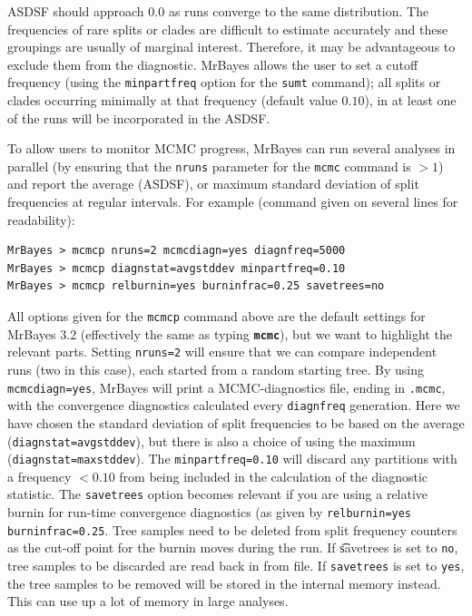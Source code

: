 \documentclass[12pt]{book}
\newcommand{\ttt}[1]{\texttt{#1}}
\newcommand{\tb}[1]{\ttt{\textbf{#1}}}
\begin{document}
ASDSF should approach $0.0$ as runs converge to the same distribution. The frequencies of rare
splits or clades are difficult to estimate accurately and these groupings are usually of marginal
interest. Therefore, it may be advantageous to exclude them from the diagnostic. MrBayes allows the
user to set a cutoff frequency (using the \ttt{minpartfreq} option for the \ttt{sumt} command); all
splits or clades occurring minimally at that frequency (default value $0.10$), in at least one of
the runs will be incorporated in the ASDSF.

To allow users to monitor MCMC progress, MrBayes can run several analyses in parallel (by ensuring
that the \ttt{nruns} parameter for the \ttt{mcmc} command is $>1$) and report the average (ASDSF),
or maximum standard deviation of split frequencies at regular intervals. For example (command given
on several lines for readability):

\small
\begin{singlespacing}
\begin{verbatim}
MrBayes > mcmcp nruns=2 mcmcdiagn=yes diagnfreq=5000
MrBayes > mcmcp diagnstat=avgstddev minpartfreq=0.10
MrBayes > mcmcp relburnin=yes burninfrac=0.25 savetrees=no
\end{verbatim}
\end{singlespacing}
\normalsize

All options given for the \ttt{mcmcp} command above are the default settings for MrBayes 3.2
(effectively the same as typing \tb{mcmc}), but we want to highlight the relevant parts. Setting
\ttt{nruns=2} will ensure that we can compare independent runs (two in this case), each started
from a random starting tree. By using \ttt{mcmcdiagn=yes}, MrBayes will print a MCMC-diagnostics
file, ending in \ttt{.mcmc}, with the convergence diagnostics calculated every \ttt{diagnfreq}
generation. Here we have chosen the standard deviation of split frequencies to be based on the
average (\ttt{diagnstat=avgstddev}), but there is also a choice of using the maximum
(\ttt{diagnstat=maxstddev}). The \ttt{minpartfreq=0.10} will discard any partitions with a
frequency $<0.10$ from being included in the calculation of the diagnostic statistic. The
\ttt{savetrees} option becomes relevant if you are using a relative burnin for run-time convergence
diagnostics (as given by \ttt{relburnin=yes burninfrac=0.25}. Tree samples need to be deleted from
split frequency counters as the cut-off point for the burnin moves during the run. If \t{savetrees}
is set to \ttt{no}, tree samples to be discarded are read back in from file. If \ttt{savetrees} is
set to \ttt{yes}, the tree samples to be removed will be stored in the internal memory instead.
This can use up a lot of memory in large analyses.
\end{document}
